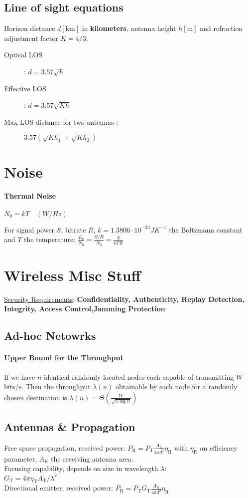 \documentclass[10pt, a4paper,twocolumn]{scrartcl}
\begin{document}
\subsection{Line of sight equations}
Horizon distance $d[\textrm{km}]$ in \textbf{kilometers}, antenna height $h[\textrm{m}]$ and refraction adjustment factor $K = 4/3$:
\begin{description}
\item[Optical LOS]: $d = 3.57\sqrt{h}$
\item[Effective LOS]: $d = 3.57\sqrt{Kh}$
\item[Max LOS distance for two antennas :] $3.57(\sqrt{Kh_1}+ \sqrt{Kh_2})$
\end{description}

\section{Noise}
\paragraph{Thermal Noise}$N_0 = kT\quad(W/Hz)$

For signal power $S$, bitrate $R$, $k = 1.3806\cdot10^{-23} JK^{-1}$ the Boltzmann constant and $T$ the temperature: $\frac{E_b}{N_0} = \frac{S/R}{N_0} = \frac{S}{kTR}$

\section{Wireless Misc Stuff}
\underline{Security Requirements}:
\textbf{Confidentiality, Authenticity, Replay Detection, Integrity, Access Control,Jamming Protection}

\subsection{Ad-hoc Netowrks} %
\paragraph{Upper Bound for the Throughput} 
If we have $n$ identical randomly located nodes each capable of transmitting $W$ bits/s. 
Then the throughput $\lambda(n)$ obtainable by each node for a randomly chosen destination is $\lambda(n) = \Theta\left(\frac W{\sqrt{n\log n}}\right)$

\subsection{Antennas \& Propagation}
Free space propagation, received power: $P_\textrm{R} = P_\textrm{T}\frac{A_\textrm{R}}{4\pi d^2}\eta_\textrm{R}$ with $\eta_\textrm{R}$ an efficiency parameter, $A_\textrm{R}$ the receiving antenna area.
\\
Focusing capability, depends on size in wavelength $\lambda$:  
\\$G_\textrm{T} = 4\pi\eta_\textrm{T}A_\textrm{T}/\lambda^2$ \\
Directional emitter, received power: $P_\textrm{R} = P_\textrm{T}G_\textrm{T}\frac{A_\textrm{R}}{4\pi d^2}\eta_\textrm{R}$
\end{document}
